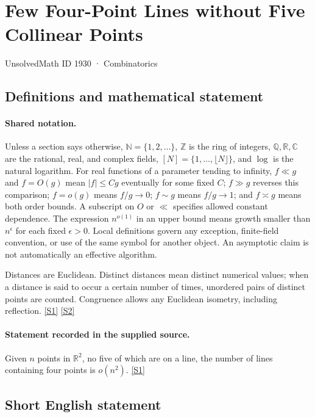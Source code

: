 \documentclass[11pt,a4paper]{article}
\newcommand{\N}{\mathbb{N}}
\newcommand{\Z}{\mathbb{Z}}
\newcommand{\Q}{\mathbb{Q}}
\newcommand{\R}{\mathbb{R}}
\newcommand{\C}{\mathbb{C}}
\newcommand{\sref}[2]{\hyperlink{source:#1:#2}{[S#2]}}
\begin{document}

\setcounter{section}{1929}

\section{Few Four-Point Lines without Five Collinear Points}\label{1930}

{\small\sffamily UnsolvedMath ID 1930 · Combinatorics}

\subsection{Definitions and mathematical statement}

\paragraph{Shared notation.}Unless a section says otherwise, $\N=\{1,2,\ldots\}$,
$\Z$ is the ring of integers, $\Q,\R,\C$ are the rational, real, and complex
fields, $[N]=\{1,\ldots,\lfloor N\rfloor\}$, and $\log$ is the natural
logarithm. For real functions of a parameter tending to infinity,
$f\ll g$ and $f=O(g)$ mean $|f|\leq Cg$ eventually for some fixed $C$;
$f\gg g$ reverses this comparison; $f=o(g)$ means $f/g\to0$;
$f\sim g$ means $f/g\to1$; and $f\asymp g$ means both order bounds.
A subscript on $O$ or $\ll$ specifies allowed constant dependence.
The expression $n^{o(1)}$ in an upper bound means growth smaller than
$n^\epsilon$ for each fixed $\epsilon>0$. Local definitions govern any
exception, finite-field convention, or use of the same symbol for another
object. An asymptotic claim is not automatically an effective algorithm.



Distances are Euclidean. Distinct distances mean distinct numerical values; when a distance is said to occur a certain number of times, unordered pairs of distinct points are counted. Congruence allows any Euclidean isometry, including reflection. \sref{1930}{1} \sref{1930}{2}

\paragraph{Statement recorded in the supplied source.}
Given $n$ points in $\mathbb{R}^2$, no five of which are on a line, the number of lines containing four points is $o(n^2)$. \sref{1930}{1}

\subsection{Short English statement}
\end{document}
